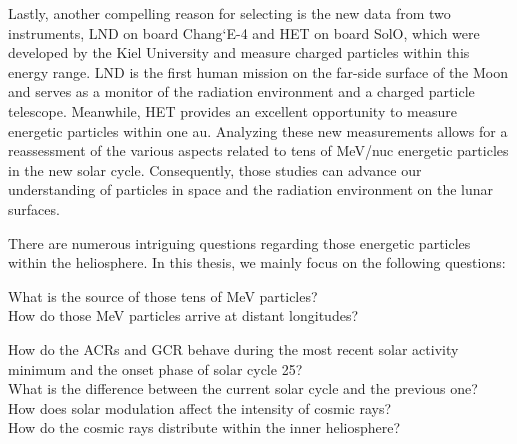 Lastly, another compelling reason for selecting is the new data from two instruments, \ac{LND} on board Chang`E-4 and \ac{HET} on board \ac{SolO}, which were developed by the Kiel University and measure charged particles within this energy range. \ac{LND} is the first human mission on the far-side surface of the Moon and serves as a monitor of the radiation environment and a charged particle telescope. Meanwhile, \ac{HET} provides an excellent opportunity to measure energetic particles within one au. Analyzing these new measurements allows for a reassessment of the various aspects related to tens of MeV/nuc energetic particles in the new solar cycle. Consequently, those studies can advance our understanding of particles in space and the radiation environment on the lunar surfaces.



There are numerous intriguing questions regarding those energetic particles within the heliosphere. In this thesis, we mainly focus on the following questions:


\begin{tcolorbox}[colback=blue!5!white,colframe=blue!75!black,title=Scientific questions - \acp{SEP}]
	What is the source of those tens of MeV particles?  \\
	How do those MeV particles arrive at distant longitudes?
\end{tcolorbox}
	


\begin{tcolorbox}[colback=blue!5!white,colframe=blue!75!black,title=Scientific questions - cosmic rays]
	How do the \acp{ACR} and \ac{GCR} behave during the most recent solar activity minimum and the onset phase of solar cycle 25? \\
	What is the difference between the current solar cycle and the previous one?\\
	How does solar modulation affect the intensity of cosmic rays?  \\
	How do the cosmic rays distribute within the inner heliosphere?

\end{tcolorbox}
	

